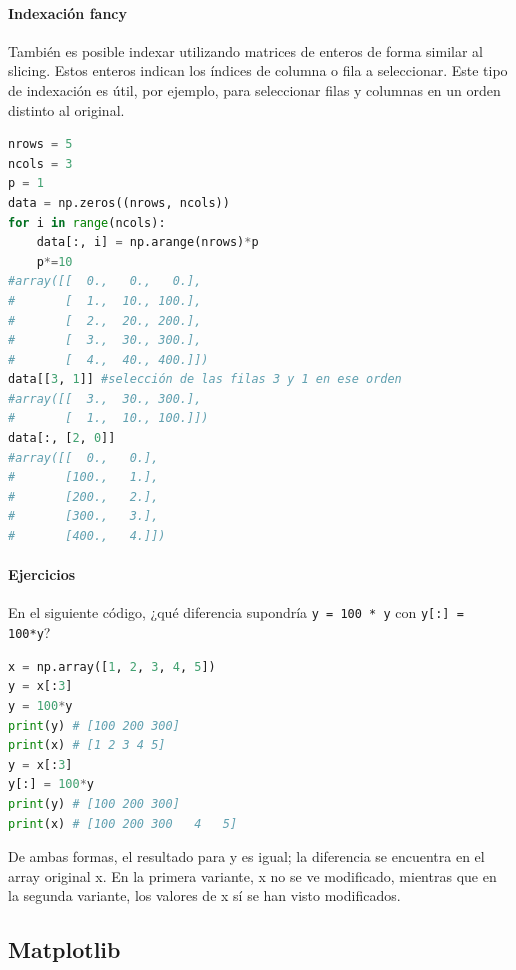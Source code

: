 \paragraph{Indexación fancy}
También es posible indexar utilizando matrices de enteros de forma similar al slicing. Estos enteros indican los índices de columna o fila a seleccionar. Este tipo de indexación es útil, por ejemplo, para seleccionar filas y columnas en un orden distinto al original.
\begin{lstlisting}[language=Python]
nrows = 5
ncols = 3
p = 1
data = np.zeros((nrows, ncols))
for i in range(ncols):
    data[:, i] = np.arange(nrows)*p
    p*=10
#array([[  0.,   0.,   0.],
#       [  1.,  10., 100.],
#       [  2.,  20., 200.],
#       [  3.,  30., 300.],
#       [  4.,  40., 400.]])
data[[3, 1]] #selección de las filas 3 y 1 en ese orden
#array([[  3.,  30., 300.],
#       [  1.,  10., 100.]])
data[:, [2, 0]]
#array([[  0.,   0.],
#       [100.,   1.],
#       [200.,   2.],
#       [300.,   3.],
#       [400.,   4.]])
\end{lstlisting}

\paragraph{Ejercicios} 
En el siguiente código, ¿qué diferencia supondría \texttt{y = 100 * y} con \texttt{y[:] = 100*y}?
\begin{lstlisting}[language=Python]
x = np.array([1, 2, 3, 4, 5])
y = x[:3]
y = 100*y
print(y) # [100 200 300]
print(x) # [1 2 3 4 5]
y = x[:3]
y[:] = 100*y
print(y) # [100 200 300]
print(x) # [100 200 300   4   5]
\end{lstlisting}
De ambas formas, el resultado para y es igual; la diferencia se encuentra en el array original x. En la primera variante, x no se ve modificado, mientras que en la segunda variante, los valores de x sí se han visto modificados.

\subsection{Matplotlib}
